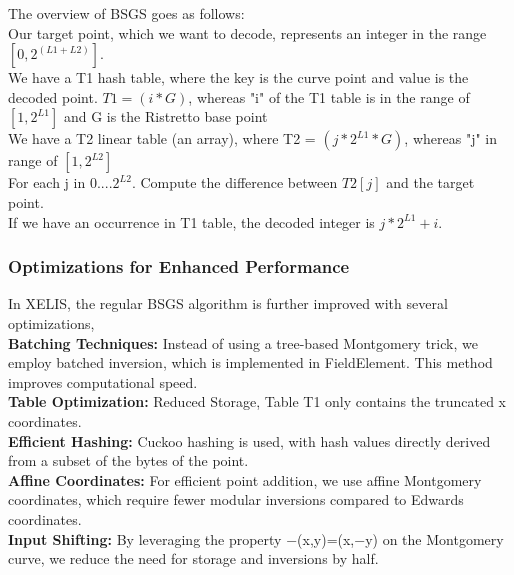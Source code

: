 \documentclass[10pt,a4paper,twocolumn]{article}
\begin{document}
The overview of BSGS goes as follows:\\

Our target point, which we want to decode, represents an integer in the range \([0, 2^{(L1 + L2)}]\).\\

We have a T1 hash table, where the key is the curve point and value is the decoded point. \(T1 = (i * G)\), whereas "i" of the T1 table is in the range of \([1, 2^{L1}]\) and G is the Ristretto base point \\

We have a T2 linear table (an array), where T2 = \((j * 2^{L1} * G)\), whereas "j" in range of \([1, 2^{L2}]\)\\

For each j in \(0....2^{L2}\). Compute the difference between \(T2[j]\) and the target point.\\

If we have an occurrence in T1 table, the decoded integer is \(j * 2^{L1} + i\).\\

\subsubsection{Optimizations for Enhanced Performance}

In XELIS, the regular BSGS algorithm is further improved with several optimizations,\\

\textbf{Batching Techniques:} Instead of using a tree-based Montgomery trick, we employ batched inversion, which is implemented in FieldElement. This method improves computational speed.\\

\textbf{Table Optimization:} Reduced Storage, Table T1 only contains the truncated x coordinates.\\

\textbf{Efficient Hashing:} Cuckoo hashing is used, with hash values directly derived from a subset of the bytes of the point.\\

\textbf{Affine Coordinates:} For efficient point addition, we use affine Montgomery coordinates, which require fewer modular inversions compared to Edwards coordinates.\\

\textbf{Input Shifting:} By leveraging the property −(x,y)=(x,−y) on the Montgomery curve, we reduce the need for storage and inversions by half.\\
\end{document}

